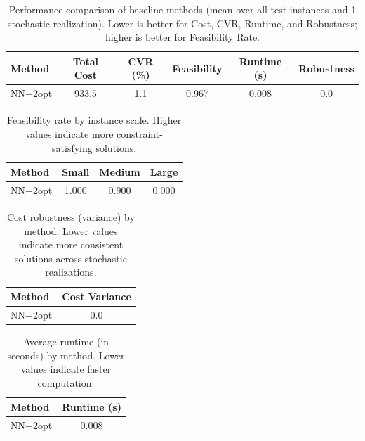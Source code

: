 

\begin{table}[ht]
\centering
\caption{Performance comparison of baseline methods (mean over all test
instances and 1 stochastic realization). Lower is better for Cost, CVR,
Runtime, and Robustness; higher is better for Feasibility Rate.}
\label{tab:main_results}
\begin{tabular}{lccccc}
\toprule
\textbf{Method} & \textbf{Total Cost} & \textbf{CVR (\%)} &
\textbf{Feasibility} & \textbf{Runtime (s)} & \textbf{Robustness} \\
\midrule
NN+2opt & 933.5 & 1.1 & 0.967 & 0.008 & 0.0 \\
\bottomrule
\end{tabular}
\end{table}

\begin{table}[ht]
\centering
\caption{Feasibility rate by instance scale. Higher values indicate
more constraint-satisfying solutions.}
\label{tab:feasibility_by_scale}
\begin{tabular}{lccc}
\toprule
\textbf{Method} & \textbf{Small} & \textbf{Medium} & \textbf{Large} \\
\midrule
NN+2opt & 1.000 & 0.900 & 0.000 \\
\bottomrule
\end{tabular}
\end{table}

\begin{table}[ht]
\centering
\caption{Cost robustness (variance) by method. Lower values indicate
more consistent solutions across stochastic realizations.}
\label{tab:robustness_variance}
\begin{tabular}{lc}
\toprule
\textbf{Method} & \textbf{Cost Variance} \\
\midrule
NN+2opt & 0.0 \\
\bottomrule
\end{tabular}
\end{table}

\begin{table}[ht]
\centering
\caption{Average runtime (in seconds) by method. Lower values indicate
faster computation.}
\label{tab:runtime_summary}
\begin{tabular}{lc}
\toprule
\textbf{Method} & \textbf{Runtime (s)} \\
\midrule
NN+2opt & 0.008 \\
\bottomrule
\end{tabular}
\end{table}

